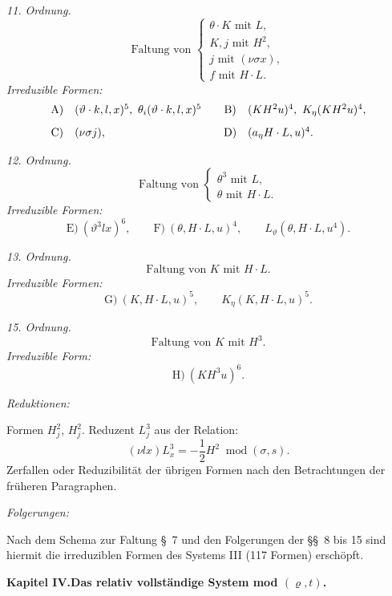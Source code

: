 \documentclass[11pt]{article}
\newcommand{\modu}[1]{\;\operatorname{mod} #1}
\providecommand{\modu}[1]{\;\operatorname{mod} #1}
\begin{document}
\noindent\emph{11. Ordnung.}
\[
\text{Faltung von }\left\{\begin{array}{l}
\theta\cdot K\text{ mit }L,\\
K,j\text{ mit }H^2,\\
j\text{ mit }(\nu\sigma x),\\
f\text{ mit }H\cdot L.
\end{array}\right.
\]
\noindent\emph{Irreduzible Formen:}
\[
\begin{array}{c@{\quad}l@{\qquad}c@{\quad}l}
\text{A)}&(\vartheta\cdot k,l,x)^5,
\ \theta_i(\vartheta\cdot k,l,x)^5&
\text{B)}&(KH^2u)^4,
\ K_\eta(KH^2u)^4,\\[0.8em]
\text{C)}&(\nu\sigma j),&
\text{D)}&(a_\eta H\cdot L,u)^4.
\end{array}
\]

\noindent\emph{12. Ordnung.}
\[
\text{Faltung von }\left\{\begin{array}{l}
\theta^3\text{ mit }L,\\
\theta\text{ mit }H\cdot L.
\end{array}\right.
\]
\noindent\emph{Irreduzible Formen:}
\[
\text{E)}\ (\vartheta^3lx)^6,
\qquad
\text{F)}\ (\theta,H\cdot L,u)^4,
\qquad L_\vartheta(\theta,H\cdot L,u^4).
\]

\noindent\emph{13. Ordnung.}
\[
\text{Faltung von }K\text{ mit }H\cdot L.
\]
\noindent\emph{Irreduzible Formen:}
\[
\text{G)}\ (K,H\cdot L,u)^5,
\qquad K_\eta(K,H\cdot L,u)^5.
\]

\noindent\emph{15. Ordnung.}
\[
\text{Faltung von }K\text{ mit }H^3.
\]
\noindent\emph{Irreduzible Form:}
\[
\text{H)}\ (KH^3u)^6.
\]

\noindent\emph{Reduktionen:}

Formen $H_j^2$, $H_j^2$. Reduzent $L_j^3$ aus der Relation:
\[
(\nu lx)L_x^3=-\frac12H^2\modu{(\sigma,s)}.
\]
Zerfallen oder Reduzibilität der übrigen Formen nach den Betrachtungen der früheren Paragraphen.

\noindent\emph{Folgerungen:}

Nach dem Schema zur Faltung \S\ 7 und den Folgerungen der \S\S\ 8 bis 15 sind hiermit die irreduziblen Formen des Systems III (117 Formen) erschöpft.



\clearpage

\begin{center}
{\Large\bfseries Kapitel IV.\quad Das relativ vollständige System mod $(\varrho,t)$.}
\end{center}
\end{document}
